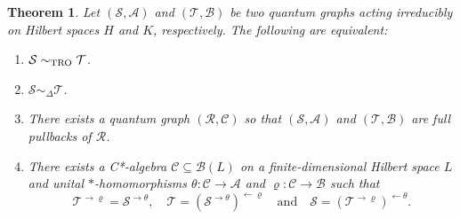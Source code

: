 \documentclass[11pt]{amsart}
\numberwithin{equation}{section}
\theoremstyle{plain}
\newtheorem{theorem}{Theorem}[section]
\theoremstyle{definition}
\theoremstyle{remark}
\newcommand{\A}{{\mathcal{A}}}
\newcommand{\B}{{\mathcal{B}}}
\newcommand{\C}{{\mathcal{C}}}
\newcommand{\R}{{\mathcal{R}}}
\renewcommand{\S}{{\mathcal{S}}}
\newcommand{\T}{{\mathcal{T}}}
\def\De{\Delta}
\newcommand{\qand}{\quad\text{and}\quad}
\begin{document}
\begin{theorem} \label{th:stronghom}
Let $(\S,\A)$ and $(\T, \B)$ be two quantum graphs acting irreducibly on Hilbert spaces $H$ and $K$, respectively. The following are equivalent:
\begin{enumerate}
\item $\S \sim_{\rm TRO} \T$.
\item $\S \sim_{\De} \T$.
\item There exists a quantum graph $(\R,\C)$ so that  $(\S, \A)$ and $(\T, \B)$ are full pullbacks of $\R$.
\item There exists a C*-algebra $\C\subseteq\B(L)$ on a finite-dimensional Hilbert space $L$ and unital $*$-homomorphisms $ \theta\colon\C\to \A $ and $ \varrho\colon \C\to \B$ such that 
\[
\T^{ \rightarrow\varrho}= \S^{\rightarrow \theta}, \quad \T= (\S^{\rightarrow \theta})^{\leftarrow \varrho} \qand \S= (\T^{\rightarrow \varrho})^{\leftarrow\theta}.
\]
\end{enumerate}
\end{theorem}
\end{document}
